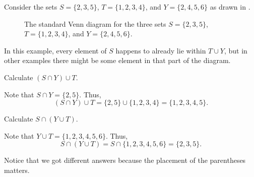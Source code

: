 \begin{exam}
\label{exam_set_ops_3sets}
    Consider the sets $S = \{2,3,5\}$, $T = \{1,2,3,4\}$, and $Y =  \{2,4,5,6\}$ as drawn in .

    \begin{figure}[hbtp]
        \centering
        
        \caption{The standard Venn diagram for the three sets $S = \{2,3,5\}$, $T = \{1,2,3,4\}$, and $Y =  \{2,4,5,6\}$.}
        \label{fig_venn_3sets_specific}
    \end{figure}

    In this example, every element of $S$ happens to already lie within $T \cup Y$, but in other examples there might be some element in that part of the diagram. 
        \begin{apart}
            \item Calculate $(S\cap Y) \cup T$.
                \begin{soln}
                    Note that $S\cap Y=\{2,5\}$.  Thus, 
                        $$(S\cap Y) \cup T = \{2,5\} \cup \{1,2,3,4\}=\{1,2,3,4,5\}.$$
                \end{soln}
            \item Calculate $S\cap (Y \cup T)$.
                \begin{soln}
                    Note that $Y \cup T=\{1,2,3,4,5,6\}$. Thus,
                        $$S\cap (Y \cup T)=S \cap \{1,2,3,4,5,6\}=\{2,3,5\}.$$

                    Notice that we got different answers because the placement of the parentheses matters.
                \end{soln}
        \end{apart}
\end{exam}


